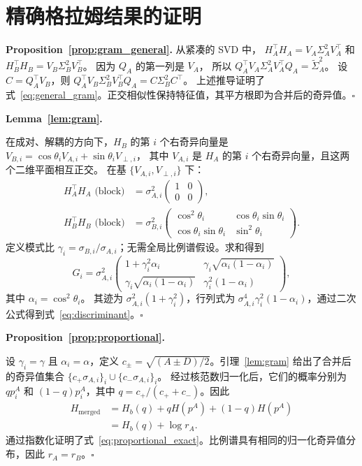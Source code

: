 \documentclass{article}
\begin{document}
\section{精确格拉姆结果的证明}
\label{app:proof_thm}

\textbf{Proposition~\ref{prop:gram_general}.}
从紧凑的 SVD 中，
$H_A^\top H_A=V_A\Sigma_A^2V_A^\top$ 和
$H_B^\top H_B=V_B\Sigma_B^2V_B^\top$。
因为 $Q_A$ 的第一列是 $V_A$，
所以 $Q_A^\top V_A\Sigma_A^2V_A^\top Q_A=\widetilde\Sigma_A^2$。
设 $C=Q_A^\top V_B$，则
$Q_A^\top V_B\Sigma_B^2V_B^\top Q_A=C\Sigma_B^2C^\top$。
上述推导证明了式~\eqref{eq:general_gram}。正交相似性保持特征值，其平方根即为合并后的奇异值。$\square$

\textbf{Lemma~\ref{lem:gram}.}

在成对、解耦的方向下，$H_B$ 的第 $i$ 个右奇异向量是
$V_{B,i}=\cos\theta_i V_{A,i}+\sin\theta_i V_{\perp,i}$，
其中 $V_{A,i}$ 是 $H_A$ 的第 $i$ 个右奇异向量，且这两个二维平面相互正交。
在基 $\{V_{A,i},V_{\perp,i}\}$ 下：
\begin{align}
  H_A^\top H_A \text{ (block)} &= \sigma_{A,i}^2\begin{pmatrix}1&0\\0&0\end{pmatrix}, \\
  H_B^\top H_B \text{ (block)} &= \sigma_{B,i}^2
    \begin{pmatrix}\cos^2\theta_i & \cos\theta_i\sin\theta_i \\
    \cos\theta_i\sin\theta_i & \sin^2\theta_i\end{pmatrix}.
\end{align}
定义模式比 $\gamma_i=\sigma_{B,i}/\sigma_{A,i}$；无需全局比例谱假设。求和得到
\begin{equation}
  G_i = \sigma_{A,i}^2\begin{pmatrix}1+\gamma_i^2\alpha_i & \gamma_i\sqrt{\alpha_i(1-\alpha_i)} \\
    \gamma_i\sqrt{\alpha_i(1-\alpha_i)} & \gamma_i^2(1-\alpha_i)\end{pmatrix},
\end{equation}
其中 $\alpha_i=\cos^2\theta_i$。
其迹为 $\sigma_{A,i}^2(1+\gamma_i^2)$，行列式为
$\sigma_{A,i}^4\gamma_i^2(1-\alpha_i)$，通过二次公式得到式~\eqref{eq:discriminant}。$\square$

\textbf{Proposition~\ref{prop:proportional}.}

设 $\gamma_i=\gamma$ 且 $\alpha_i=\alpha$，定义 $c_\pm=\sqrt{(A\pm D)/2}$。引理~\ref{lem:gram} 给出了合并后的奇异值集合
$\{c_+\sigma_{A,i}\}_i\cup\{c_-\sigma_{A,i}\}_i$。
经过核范数归一化后，它们的概率分别为 $qp_i^A$ 和 $(1-q)p_i^A$，其中
$q=c_+/(c_++c_-)$。因此
\begin{align}
 H_{\mathrm{merged}}
 &=H_b(q)+qH(p^A)+(1-q)H(p^A)\\
 &=H_b(q)+\log r_A.
\end{align}
通过指数化证明了式~\eqref{eq:proportional_exact}。比例谱具有相同的归一化奇异值分布，因此 $r_A=r_B$。$\square$
\end{document}
